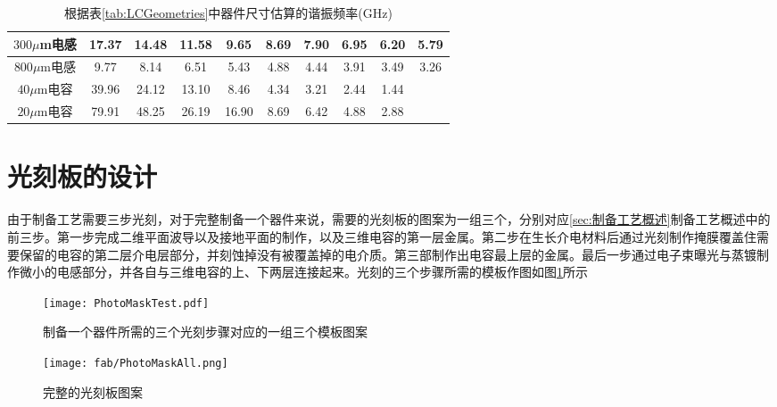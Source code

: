 \begin{table}[htb]
  \centering
  \caption{根据表\ref{tab:LCGeometries}中器件尺寸估算的谐振频率(GHz)}
  \label{tab:LCFreqsEstimate}
    \begin{tabular}{c|ccccccccc} %
      \toprule %
      $300 \mu$m电感 & 17.37 & 14.48 & 11.58 & 9.65 & 8.69 & 7.90 & 6.95 & 6.20 & 5.79 \\
      \midrule %
      $800 \mu$m电感& 9.77 & 8.14 & 6.51 & 5.43 & 4.88 & 4.44 & 3.91 & 3.49 & 3.26\\
      \midrule %
      $40\mu$m电容 & 39.96 & 24.12 & 13.10 & 8.46 & 4.34 & 3.21 & 2.44 & 1.44 & \\
      \midrule %
      $20\mu$m电容 & 79.91 & 48.25 & 26.19 & 16.90 & 8.69 & 6.42 & 4.88 & 2.88 & \\
      \bottomrule %
    \end{tabular}
\end{table}


            
            




        \section{光刻板的设计} %
        \label{sec:光刻板的设计}

            由于制备工艺需要三步光刻，对于完整制备一个器件来说，需要的光刻板的图案为一组三个，分别对应\ref{sec:制备工艺概述}制备工艺概述中的前三步。第一步完成二维平面波导以及接地平面的制作，以及三维电容的第一层金属。第二步在生长介电材料后通过光刻制作掩膜覆盖住需要保留的电容的第二层介电层部分，并刻蚀掉没有被覆盖掉的电介质。第三部制作出电容最上层的金属。最后一步通过电子束曝光与蒸镀制作微小的电感部分，并各自与三维电容的上、下两层连接起来。光刻的三个步骤所需的模板作图如图\ref{fig:one_group}所示
            

            \begin{figure}[h]
                \centering
                \texttt{[image: PhotoMaskTest.pdf]}
                \caption{制备一个器件所需的三个光刻步骤对应的一组三个模板图案}
                \label{fig:one_group}
            \end{figure}

            \begin{figure}[h]
                \centering
                \texttt{[image: fab/PhotoMaskAll.png]}
                \caption{完整的光刻板图案}
                \label{fig:LC}
            \end{figure}


